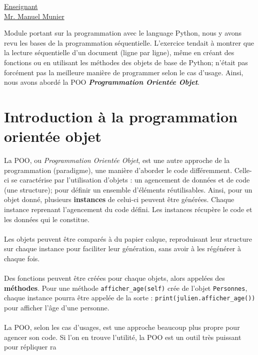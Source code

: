 \renewcommand{\figurename}{}

\vspace*{0.2cm}
      \large
      \href{\@orientadorPagina}{\color{black}Enseignant\\Mr. Manuel Munier}\\
\vspace*{0.5cm}

Module portant sur la programmation avec le language Python, nous y avons revu les bases de la programmation séquentielle. L'exercice tendait à montrer que la lecture séquentielle d'un document (ligne par ligne), même en créant des fonctions ou en utilisant les méthodes des objets de base de Python; n'était pas forcément pas la meilleure manière de programmer selon le cas d'usage. Ainsi, nous avons abordé la POO \textit{\textbf{Programmation Orientée Objet}}.

\section{Introduction à la programmation orientée objet}

La POO, ou \textit{Programmation Orientée Objet}, est une autre approche de la programmation (paradigme), une manière d'aborder le code différemment. Celle-ci se caractérise par l'utilisation d'objets : un agencement de données et de code (une structure); pour définir un ensemble d'éléments réutilisables. Ainsi, pour un objet donné, plusieurs \textbf{instances} de celui-ci peuvent être générées. Chaque instance reprenant l'agencement du code défini. Les instances récupère le code et les données qui le constitue.
\\ \\
Les objets peuvent être comparés à du papier calque, reproduisant leur structure sur chaque instance pour faciliter leur génération, sans avoir à les régénérer à chaque fois.
\\ \\
Des fonctions peuvent être créées pour chaque objets, alors appelées des \textbf{méthodes}. Pour une méthode \verb|afficher_age(self)| crée de l'objet \verb|Personnes|, chaque instance pourra être appelée de la sorte : \verb|print(julien.afficher_age())| pour afficher l'âge d'une personne.
\\ \\
La POO, selon les cas d'usages, est une approche beaucoup plus propre pour agencer son code. Si l'on en trouve l'utilité, la POO est un outil très puissant pour répliquer ra

